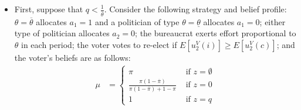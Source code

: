 \documentclass[11pt,english]{article}
\begin{document}
\begin{itemize}
\item First, suppose that $q < \frac{1}{\overline{\theta}}$.
Consider the following strategy and belief profile: $\theta = \overline{\theta}$ allocates $a_1 = 1$ and a politician of type $\theta = \underline{\theta}$ allocates $a_1 = 0$; either type of politician allocates $a_2 = 0$; the bureaucrat exerts effort proportional to $\theta$ in each period; the voter votes to re-elect if $E[u_2^V(i)] \geq E[u_2^V(c)]$; and the voter's beliefs are as follows:
\begin{align}\label{mu:unique3}
\mu &= \begin{cases}
\pi & \text{ if }z = \emptyset\\
\frac{\pi(1-\overline{\pi})}{\pi(1-\overline{\pi})+ 1-\pi}&\text{ if }z = 0\\
1 & \text{ if }z = q
\end{cases} 
\end{align}


\end{itemize}
\end{document}
